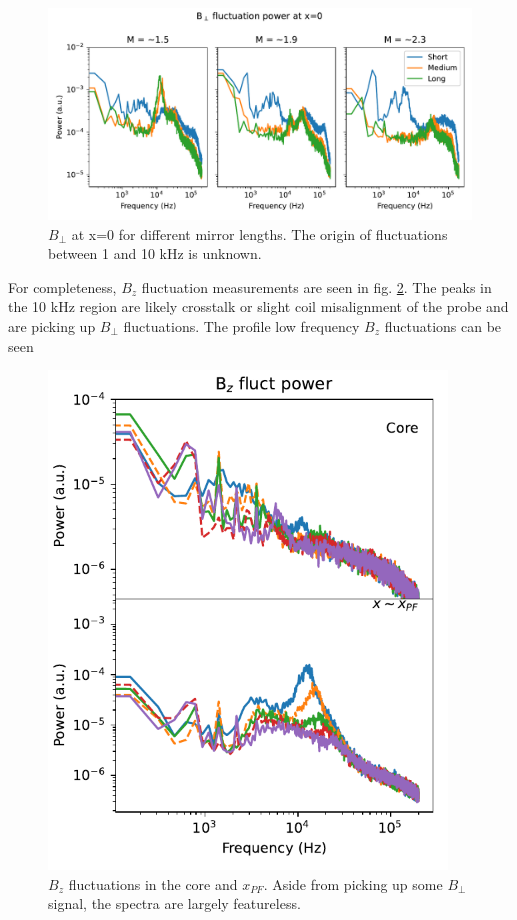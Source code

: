 \begin{figure}
    \centering
    \includegraphics[width=400pt]{figures/extra/Bperp_power_core_lengths.pdf}
    \caption[$B_\perp$ fluctuations at x=0 for different mirror lengths]{$B_\perp$ at x=0 for different mirror lengths. The origin of fluctuations between 1 and 10 kHz is unknown.}
    \label{fig_extra:Bperp_power_core_lengths}
\end{figure}

For completeness, $B_z$ fluctuation measurements are seen in fig. \ref{fig_extra:Bz}. The peaks in the 10 kHz region are likely crosstalk or slight coil misalignment of the probe and are picking up $B_\perp$ fluctuations. The profile low frequency $B_z$ fluctuations can be seen 

\begin{figure}
    \centering
    \includegraphics[width=300pt]{figures/extra/Bz_fluct_power_core_edge.pdf}
    \caption[$B_z$ fluctuations in the core and $x_{PF}$]{$B_z$ fluctuations in the core and $x_{PF}$. Aside from picking up some $B_\perp$ signal, the spectra are largely featureless.}
    \label{fig_extra:Bz}
\end{figure}


